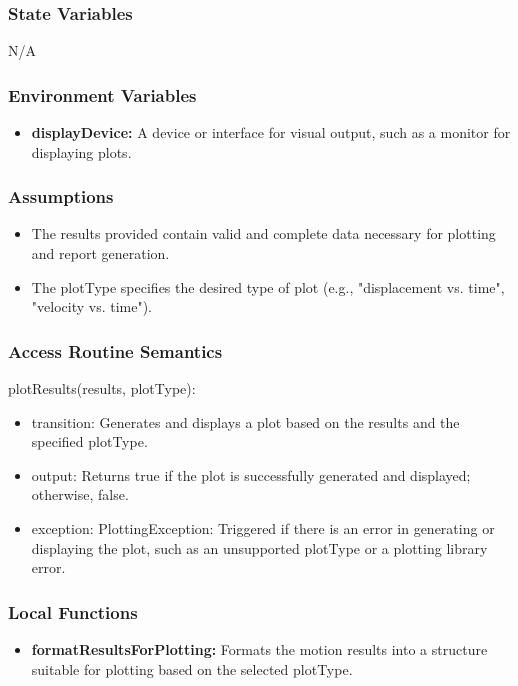 \documentclass[12pt, titlepage]{article}
\begin{document}
\subsubsection{State Variables}
N/A

\subsubsection{Environment Variables}
\begin{itemize}
  \item \textbf{displayDevice:} A device or interface for visual output, such as a monitor for displaying plots.
\end{itemize}

\subsubsection{Assumptions}

\begin{itemize}
  \item The results provided contain valid and complete data necessary for plotting and report generation.
  \item The plotType specifies the desired type of plot (e.g., "displacement vs. time", "velocity vs. time").
\end{itemize}

\subsubsection{Access Routine Semantics}

\noindent plotResults(results, plotType):
\begin{itemize}
\item transition: Generates and displays a plot based on the results and the specified plotType.
\item output: Returns true if the plot is successfully generated and displayed; otherwise, false.
\item exception: PlottingException: Triggered if there is an error in generating or displaying the plot, such as an unsupported plotType or a plotting library error.
\end{itemize}

\subsubsection{Local Functions}

\begin{itemize}
  \item \textbf{formatResultsForPlotting:} Formats the motion results into a structure suitable for plotting based on the selected plotType.
\end{itemize}
\end{document}
